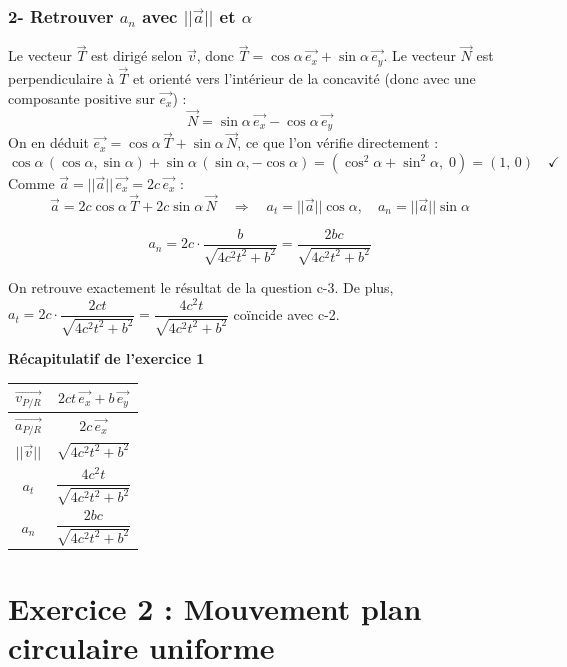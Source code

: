 \documentclass[11pt,a4paper]{article}
\begin{document}
\subsubsection*{2- Retrouver $a_n$ avec $||\vec{a}||$ et $\alpha$}
Le vecteur $\vec{T}$ est dirigé selon $\vec{v}$, donc $\vec{T} = \cos\alpha\,\vec{e_x} + \sin\alpha\,\vec{e_y}$. Le vecteur $\vec{N}$ est perpendiculaire à $\vec{T}$ et orienté vers l'intérieur de la concavité (donc avec une composante positive sur $\vec{e_x}$) :
$$ \vec{N} = \sin\alpha\,\vec{e_x} - \cos\alpha\,\vec{e_y} $$
On en déduit $\vec{e_x} = \cos\alpha\,\vec{T} + \sin\alpha\,\vec{N}$, ce que l'on vérifie directement :
$$ \cos\alpha\,(\cos\alpha,\sin\alpha) + \sin\alpha\,(\sin\alpha,-\cos\alpha) = (\cos^2\alpha+\sin^2\alpha,\; 0) = (1,\,0) \quad\checkmark $$
Comme $\vec{a} = ||\vec{a}||\,\vec{e_x} = 2c\,\vec{e_x}$ :
$$ \vec{a} = 2c\cos\alpha\,\vec{T} + 2c\sin\alpha\,\vec{N} \quad\Longrightarrow\quad a_t = ||\vec{a}||\cos\alpha,\quad a_n = ||\vec{a}||\sin\alpha $$
\begin{sonucbox}
$$ a_n = 2c\cdot\frac{b}{\sqrt{4c^2t^2 + b^2}} = \frac{2bc}{\sqrt{4c^2t^2 + b^2}} $$
\end{sonucbox}
On retrouve exactement le résultat de la question c-3. De plus, $a_t = 2c\cdot\dfrac{2ct}{\sqrt{4c^2t^2+b^2}} = \dfrac{4c^2t}{\sqrt{4c^2t^2+b^2}}$ coïncide avec c-2.

\begin{sonucbox}
\textbf{Récapitulatif de l'exercice 1}
\begin{center}
\renewcommand{\arraystretch}{1.8}
\begin{tabular}{|c|c|}
\hline
$\vec{v_{P/R}}$ & $2ct\,\vec{e_x} + b\,\vec{e_y}$ \\
\hline
$\vec{a_{P/R}}$ & $2c\,\vec{e_x}$ \\
\hline
$||\vec{v}||$ & $\sqrt{4c^2t^2+b^2}$ \\
\hline
$a_t$ & $\dfrac{4c^2t}{\sqrt{4c^2t^2+b^2}}$ \\
\hline
$a_n$ & $\dfrac{2bc}{\sqrt{4c^2t^2+b^2}}$ \\
\hline
\end{tabular}
\end{center}
\end{sonucbox}

\newpage

\section*{Exercice 2 : Mouvement plan circulaire uniforme}
\end{document}
